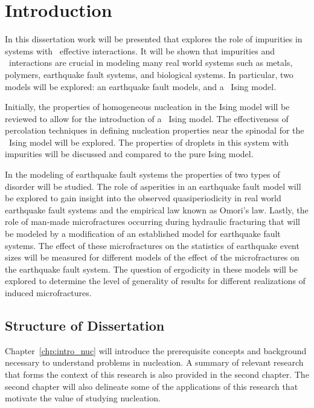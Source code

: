 

\chapter{\label{chp:intro}Introduction}
In this dissertation work will be presented that explores the role of impurities in systems with \lr\ effective interactions. It will be shown that impurities and \lr\ interactions are crucial in modeling many real world systems such as metals, polymers, earthquake fault systems, and biological systems. In particular, two models will be explored: an earthquake fault models, and a \het\ Ising model. 

Initially, the properties of homogeneous nucleation in the Ising model will be reviewed to allow for the introduction of a \het\ Ising model. The effectiveness of percolation techniques in defining nucleation properties near the spinodal for the \het\ Ising model will be explored. The properties of droplets in this system with impurities will be discussed and compared to the pure Ising model.

In the modeling of earthquake fault systems the properties of two types of disorder will be studied. The role of asperities in an earthquake fault model will be explored to gain insight into the observed quasiperiodicity in real world earthquake fault systems and the empirical law known as Omori's law. Lastly, the role of man-made microfractures occurring during hydraulic fracturing that will be modeled by a modification of an established model for earthquake fault systems. The effect of these microfractures on the statistics of earthquake event sizes will be measured for different models of the effect of the microfractures on the earthquake fault system. The question of  ergodicity in these models will be explored to determine the level of generality of results for different realizations of induced microfractures. 

\section{Structure of Dissertation}
Chapter~\ref{chp:intro_nuc} will introduce the prerequisite concepts and background necessary to understand  problems in nucleation. A summary of relevant research that forms the context of this research  is also provided in the second chapter. The second chapter will also delineate some of the applications of this research that motivate the value of studying nucleation. 

